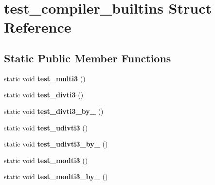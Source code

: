 \hypertarget{structtest__compiler__builtins}{}\section{test\+\_\+compiler\+\_\+builtins Struct Reference}
\label{structtest__compiler__builtins}
\subsection*{Static Public Member Functions}
\begin{DoxyCompactItemize}
\item 
\mbox{\label{structtest__compiler__builtins_ac7fc510790bbe2fb1f2cf9ed73db052d}} 
static void {\bfseries test\+\_\+multi3} ()
\item 
\mbox{\label{structtest__compiler__builtins_a6df6fb65c9d741135382bb92932f31de}} 
static void {\bfseries test\+\_\+divti3} ()
\item 
\mbox{\label{structtest__compiler__builtins_ad0170939f36ff64b0c8ba71a8eacbd92}} 
static void {\bfseries test\+\_\+divti3\+\_\+by\+\_} ()
\item 
\mbox{\label{structtest__compiler__builtins_a0c1e126c7223fb1257f5c52220c9058a}} 
static void {\bfseries test\+\_\+udivti3} ()
\item 
\mbox{\label{structtest__compiler__builtins_ac56dfccebb9c3e35ad75042bf906a327}} 
static void {\bfseries test\+\_\+udivti3\+\_\+by\+\_} ()
\item 
\mbox{\label{structtest__compiler__builtins_a6cabe05c8f2f2f9905078f123a56979b}} 
static void {\bfseries test\+\_\+modti3} ()
\item 
\mbox{\label{structtest__compiler__builtins_a1c9651522613f4c5af6e81dc8a99404d}} 
static void {\bfseries test\+\_\+modti3\+\_\+by\+\_} ()
\item 
\mbox{\label{structtest__compiler__builtins_a8975667edac70967b7f3d0c47236ebc8}} 

\end{DoxyCompactItemize}
